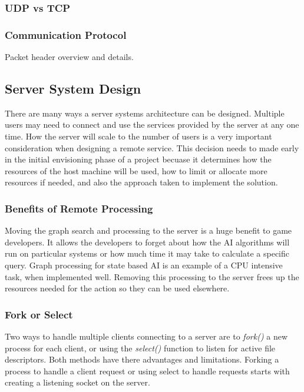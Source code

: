 \documentclass[12pt,a4paper,titlepage]{article}
\begin{document}
\subsubsection{UDP vs TCP}

\subsubsection{Communication Protocol}

Packet header overview and details.\\

\subsection{Server System Design}
\label{section:serverdesign}

There are many ways a server systems architecture can be designed. Multiple users may need to connect and use the services provided by the server at any one time. How the server will scale to the number of users is a very important consideration when designing a remote service. This decision needs to made early in the initial envisioning phase of a project becuase it determines how the resources of the host machine will be used, how to limit or allocate more resources if needed, and also the approach taken to implement the solution.\\

\subsubsection{Benefits of Remote Processing}

Moving the graph search and processing to the server is a huge benefit to game developers. It allows the developers to forget about how the AI algorithms will run on particular systems or how much time it may take to calculate a specific query. Graph processing for state based AI is an example of a CPU intensive task, when implemented well. Removing this processing to the server frees up the resources needed for the action so they can be used elsewhere.\\


\subsubsection{Fork or Select}

Two ways to handle multiple clients connecting to a server are to \textit{fork()} a new process for each client, or using the \textit{select()} function to listen for active file descriptors. Both methods have there advantages and limitations. Forking a process to handle a client request or using select to handle requests starts with creating a listening socket on the server. 
\end{document}
